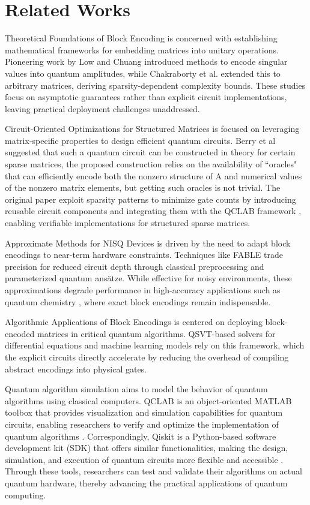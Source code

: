 \documentclass{article}
\begin{document}
\section{Related Works}

\label{sec:related_works}

Theoretical Foundations of Block Encoding is concerned with establishing mathematical frameworks for embedding matrices into unitary operations. Pioneering work by Low and Chuang\cite{low2017optimal}
introduced methods to encode singular values into quantum amplitudes, while Chakraborty et al.\cite{chakraborty2018power}
extended this to arbitrary matrices, deriving sparsity-dependent complexity bounds. These studies focus on asymptotic guarantees rather than explicit circuit implementations, leaving practical deployment challenges unaddressed.

Circuit-Oriented Optimizations for Structured Matrices is focused on leveraging matrix-specific properties to design efficient quantum circuits.
Berry et al \cite{berry2015hamiltonian} suggested that such a quantum circuit can
be constructed in theory for certain sparse matrices, the proposed construction relies on the availability of “oracles" that
can efficiently encode both the nonzero structure of A and numerical values of the nonzero matrix elements, but getting such oracles is not trivial.
The original paper exploit sparsity patterns to minimize gate counts by introducing reusable circuit components and integrating them with the QCLAB framework
, enabling verifiable implementations for structured sparse matrices.

Approximate Methods for NISQ Devices is driven by the need to adapt block encodings to near-term hardware constraints. Techniques like FABLE \cite{camps2022fable}
trade precision for reduced circuit depth through classical preprocessing and parameterized quantum ansätze. While effective for noisy environments, these approximations degrade performance in high-accuracy applications such as quantum chemistry
, where exact block encodings remain indispensable.

Algorithmic Applications of Block Encodings is centered on deploying block-encoded matrices in critical quantum algorithms. QSVT-based solvers \cite{Gilyen2019}for differential equations
and machine learning models rely on this framework, which the explicit circuits directly accelerate by reducing the overhead of compiling abstract encodings into physical gates.

Quantum algorithm simulation aims to model the behavior of quantum algorithms using classical computers.
QCLAB \cite{keip2025qclab} is an object-oriented MATLAB toolbox that provides visualization and simulation capabilities for quantum circuits, enabling researchers to verify and optimize the implementation of quantum algorithms .
Correspondingly, Qiskit\cite{wille2019ibm} is a Python-based software development kit (SDK) that offers similar functionalities, making the design, simulation, and execution of quantum circuits more flexible and accessible .
Through these tools, researchers can test and validate their algorithms on actual quantum hardware, thereby advancing the practical applications of quantum computing.
\end{document}
